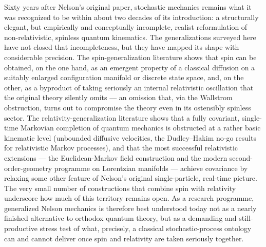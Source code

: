\documentclass[11pt]{article}
\begin{document}
Sixty years after Nelson's original paper, stochastic mechanics remains what it
was recognized to be within about two decades of its introduction: a
structurally elegant, but empirically and conceptually incomplete, realist
reformulation of non-relativistic, spinless quantum kinematics. The
generalizations surveyed here have not closed that incompleteness, but they
have mapped its shape with considerable precision. The spin-generalization
literature shows that spin can be obtained, on the one hand, as an emergent
property of a classical diffusion on a suitably enlarged configuration manifold
or discrete state space, and, on the other, as a byproduct of taking seriously
an internal relativistic oscillation that the original theory silently omits
--- an omission that, via the Wallstrom obstruction, turns out to compromise
the theory even in its ostensibly spinless sector. The
relativity-generalization literature shows that a fully covariant, single-time
Markovian completion of quantum mechanics is obstructed at a rather basic
kinematic level (unbounded diffusive velocities, the Dudley--Hakim no-go
results for relativistic Markov processes), and that the most successful
relativistic extensions --- the Euclidean-Markov field construction and the
modern second-order-geometry programme on Lorentzian manifolds --- achieve
covariance by relaxing some other feature of Nelson's original single-particle,
real-time picture. The very small number of constructions that combine spin
with relativity underscore how much of this territory remains open. As a
research programme, generalized Nelson mechanics is therefore best understood
today not as a nearly finished alternative to orthodox quantum theory, but as a
demanding and still-productive stress test of what, precisely, a classical
stochastic-process ontology can and cannot deliver once spin and relativity are
taken seriously together.
\end{document}

